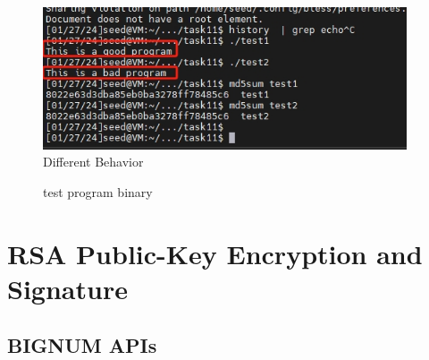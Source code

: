 \documentclass[a4paper]{article}
\begin{document}
\begin{figure}[h]
    \centering
       \includegraphics[width=0.96\textwidth]{figures/task11/differentbehaviors.png}
    \caption{Different Behavior}\label{fig:task11}
\end{figure}

\begin{figure}[h]
    \centering
    \hfill
    \hfill
    \caption{test program binary}\label{fig:task11tests}
\end{figure}


\section{RSA Public-Key Encryption and Signature}

\subsection{BIGNUM APIs}
\end{document}
